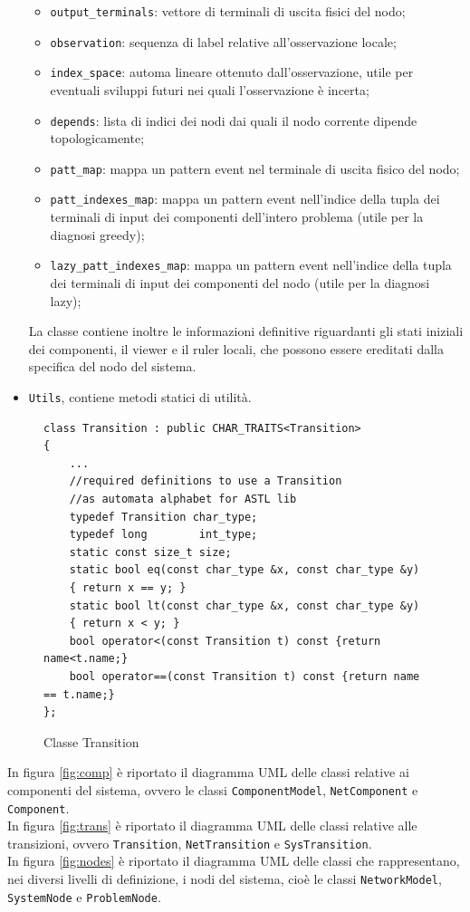 \begin{itemize}
\begin{itemize}
\item \verb|output_terminals|: vettore di terminali di uscita fisici del nodo;
\item \verb|observation|: sequenza di label relative all'osservazione locale;
\item \verb|index_space|: automa lineare ottenuto dall'osservazione, utile per eventuali sviluppi futuri nei quali l'osservazione è incerta;
\item \verb|depends|: lista di indici dei nodi dai quali il nodo corrente dipende topologicamente;
\item \verb|patt_map|: mappa un pattern event nel terminale di uscita fisico del nodo;
\item \verb|patt_indexes_map|: mappa un pattern event nell'indice della tupla dei terminali di input dei componenti dell'intero problema (utile per la diagnosi greedy);
\item \verb|lazy_patt_indexes_map|: mappa un pattern event nell'indice della tupla dei terminali di input dei componenti del nodo (utile per la diagnosi lazy);
\end{itemize}
La classe contiene inoltre le informazioni definitive riguardanti gli stati iniziali dei componenti, il viewer e il ruler locali, che possono essere ereditati dalla specifica del nodo del sistema.
\item \verb|Utils|, contiene metodi statici di utilità.
\end{itemize}


\begin{figure}[htbp]
\begin{verbatim}
class Transition : public CHAR_TRAITS<Transition>
{
    ...
    //required definitions to use a Transition 
    //as automata alphabet for ASTL lib
    typedef Transition char_type;
    typedef long        int_type;
    static const size_t size;
    static bool eq(const char_type &x, const char_type &y) 
    { return x == y; }
    static bool lt(const char_type &x, const char_type &y) 
    { return x < y; }
    bool operator<(const Transition t) const {return name<t.name;}
    bool operator==(const Transition t) const {return name == t.name;}
};
\end{verbatim}
\caption{Classe Transition}
\label{class_trans}
\end{figure}

In figura \ref{fig:comp} è riportato il diagramma UML delle classi relative ai componenti del sistema, ovvero le classi \verb|ComponentModel|, \verb|NetComponent| e \verb|Component|.\\
In figura \ref{fig:trans} è riportato il diagramma UML delle classi relative alle transizioni, ovvero \verb|Transition|, \verb|NetTransition| e \verb|SysTransition|.\\
In figura \ref{fig:nodes} è riportato il diagramma UML delle classi che rappresentano, nei diversi livelli di definizione, i nodi del sistema, cioè le classi \verb|NetworkModel|, \verb|SystemNode| e \verb|ProblemNode|.

